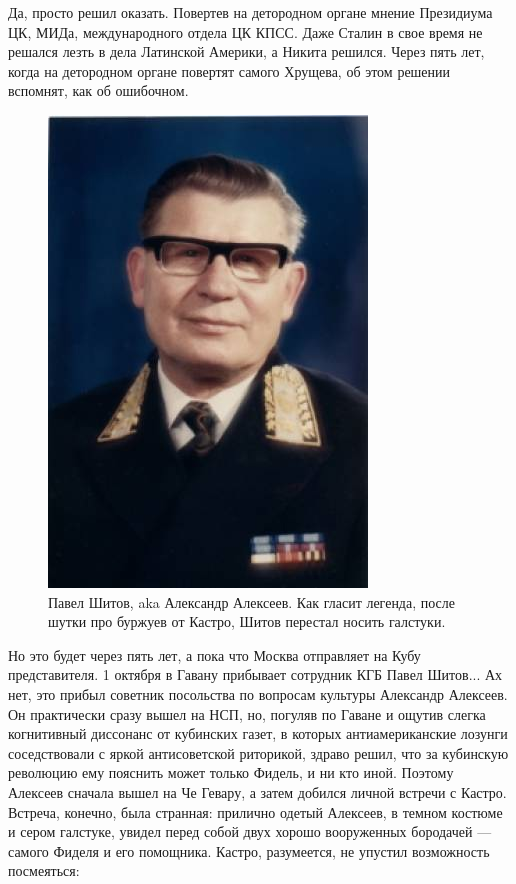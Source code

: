 Да, просто решил оказать. Повертев на детородном органе мнение Президиума ЦК, МИДа, международного отдела ЦК КПСС. Даже Сталин в свое время не решался лезть в дела Латинской Америки, а Никита решился. Через пять лет, когда на детородном органе повертят самого Хрущева, об этом решении вспомнят, как об ошибочном.

\begin{figure}[h!tb] 
	\centering\includegraphics[scale=0.4]{KubaUSSR/4zrs8J7BhV4.jpg}
	\caption{Павел Шитов, aka Александр Алексеев. Как гласит легенда, после шутки про буржуев от Кастро, Шитов перестал носить галстуки. }%
\end{figure}

Но это будет через пять лет, а пока что Москва отправляет на Кубу представителя. 1 октября в Гавану прибывает сотрудник КГБ Павел Шитов... Ах нет, это прибыл советник посольства по вопросам культуры Александр Алексеев. Он практически сразу вышел на НСП, но, погуляв по Гаване и ощутив слегка когнитивный диссонанс от кубинских газет, в которых антиамериканские лозунги соседствовали с яркой антисоветской риторикой, здраво решил, что за кубинскую революцию ему пояснить может только Фидель, и ни кто иной. Поэтому Алексеев сначала вышел на Че Гевару, а затем добился личной встречи с Кастро. Встреча, конечно, была странная: прилично одетый Алексеев, в темном костюме и сером галстуке, увидел перед собой двух хорошо вооруженных бородачей — самого Фиделя и его помощника. Кастро, разумеется, не упустил возможность посмеяться:

